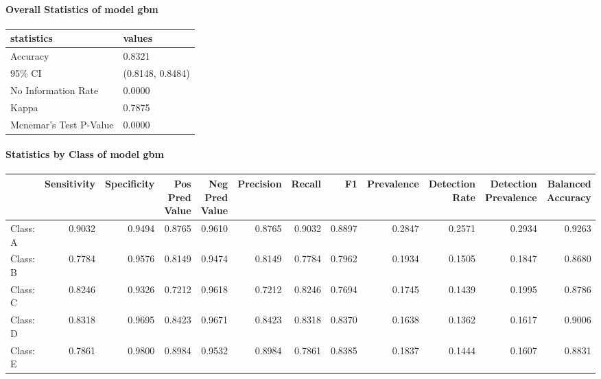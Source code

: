 \documentclass[]{article}
\let\oldparagraph\paragraph
\renewcommand{\paragraph}[1]{\oldparagraph{#1}\mbox{}}
\begin{document}
\paragraph{Overall Statistics of model
gbm}\label{overall-statistics-of-model-gbm}

\begin{table}[H]
\centering
\begin{tabular}{l|l}
\hline
statistics & values\\
\hline
Accuracy & 0.8321\\
\hline
95\% CI & (0.8148, 0.8484)\\
\hline
No Information Rate & 0.0000\\
\hline
Kappa & 0.7875\\
\hline
Mcnemar's Test P-Value & 0.0000\\
\hline
\end{tabular}
\end{table}

\paragraph{Statistics by Class of model
gbm}\label{statistics-by-class-of-model-gbm}

\begingroup\fontsize{11}{13}\selectfont

\begin{tabular}{l|r|r|r|r|r|r|r|r|r|r|r}
\hline
  & Sensitivity & Specificity & Pos Pred Value & Neg Pred Value & Precision & Recall & F1 & Prevalence & Detection Rate & Detection Prevalence & Balanced Accuracy\\
\hline
Class: A & 0.9032 & 0.9494 & 0.8765 & 0.9610 & 0.8765 & 0.9032 & 0.8897 & 0.2847 & 0.2571 & 0.2934 & 0.9263\\
\hline
Class: B & 0.7784 & 0.9576 & 0.8149 & 0.9474 & 0.8149 & 0.7784 & 0.7962 & 0.1934 & 0.1505 & 0.1847 & 0.8680\\
\hline
Class: C & 0.8246 & 0.9326 & 0.7212 & 0.9618 & 0.7212 & 0.8246 & 0.7694 & 0.1745 & 0.1439 & 0.1995 & 0.8786\\
\hline
Class: D & 0.8318 & 0.9695 & 0.8423 & 0.9671 & 0.8423 & 0.8318 & 0.8370 & 0.1638 & 0.1362 & 0.1617 & 0.9006\\
\hline
Class: E & 0.7861 & 0.9800 & 0.8984 & 0.9532 & 0.8984 & 0.7861 & 0.8385 & 0.1837 & 0.1444 & 0.1607 & 0.8831\\
\hline
\end{tabular}

\endgroup{}
\end{document}
